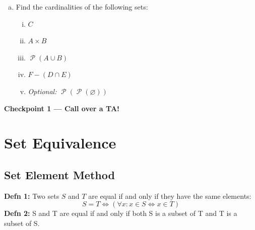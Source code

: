 \documentclass[12pt,letterpaper]{article}
\newcommand\Pow{\ensuremath{\operatorname{\mathcal{P}}}}
\begin{document}
\begin{enumerate}[a.]
\begin{enumerate}[i.]
            \item \textit{Optional: }$(D \times E) - (E \times F)$
            \begin{mdframed} \vspace{0.5cm} \end{mdframed}
            \item \textit{Optional: }$(D - E) \cap (D \cap E)$
            \begin{mdframed} \vspace{0.5cm} \end{mdframed}
	   \end{enumerate}
  \item Find the cardinalities of the following sets:
        \begin{enumerate}[i.]
          \item $C$
          \begin{mdframed} \vspace{0.5cm} \end{mdframed}
          \item $A \times B$
          \begin{mdframed} \vspace{0.5cm} \end{mdframed}
          \item $\Pow(A \cup B)$
          \begin{mdframed} \vspace{0.5cm} \end{mdframed}
          \item $F - (D \cap E)$
          \begin{mdframed} \vspace{0.5cm} \end{mdframed}
          \item \textit{Optional: }$\Pow(\Pow(\varnothing))$
          \begin{mdframed} \vspace{0.5cm} \end{mdframed}
        \end{enumerate}
\end{enumerate}

\textbf{Checkpoint 1 — Call over a TA!}

\newpage
\section*{Set Equivalence}
\subsection*{Set Element Method}
\textbf{Defn 1:} Two sets $S$ and $T$ are equal if and only if they have the same elements:
\begin{equation*}
    S = T \iff (\forall x : x \in S \iff x \in T)
\end{equation*}
\textbf{Defn 2:} S and T are equal if and only if both S is a subset of T and T is a subset of S.
\end{document}
